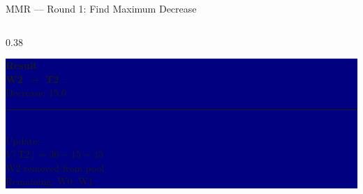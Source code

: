 \documentclass[aspectratio=169]{beamer}
\begin{document}
\begin{frame}{MMR --- Round 1: Find Maximum Decrease}
\begin{columns}[T]
    \begin{column}{0.38\textwidth}
      \colorbox{navy}{\begin{minipage}{\linewidth}
        \vspace{0.2cm}\centering
        {\color{teal}\bfseries Result}\\[0.2cm]
        {\color{white}\Large\bfseries W2 $\rightarrow$ T2}\\[0.15cm]
        {\color{amber} Decrease: 15.0}\\[0.2cm]
        {\color{teal}\rule{3cm}{0.3pt}}\\[0.15cm]
        {\color{mygray}\small Update:}\\
        {\color{teallt}\small $V[\text{T2}] = 30 - 15 = 15$}\\[0.1cm]
        {\color{mygray}\small W2 removed from pool}\\[0.1cm]
        {\color{teallt}\small Remaining: W0, W1}
        \vspace{0.2cm}
      \end{minipage}}
    \end{column}
  \end{columns}
\end{frame}
\end{document}
